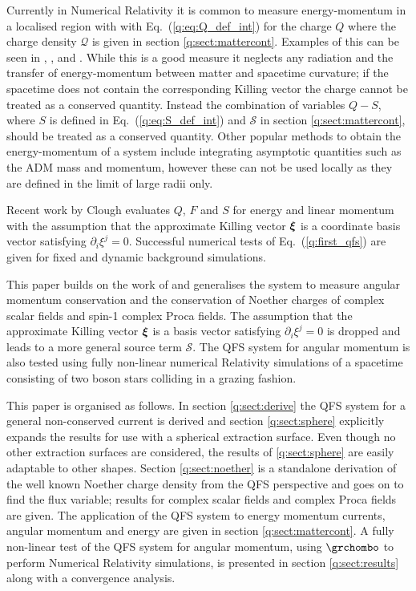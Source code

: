 Currently in Numerical Relativity it is common to measure energy-momentum in a localised region with with Eq.~(\ref{q:eq:Q_def_int}) for the charge $Q$ where the charge density $\mathcal{Q}$ is given in section \ref{q:sect:mattercont}. Examples of this can be seen in \cite{Sanchis_Gual_2019}, \cite{Di_Giovanni_2020},  \cite{PhysRevD.103.044059} and \cite{PhysRevD.96.024004}. While this is a good measure it neglects any radiation and the transfer of energy-momentum between matter and spacetime curvature; if the spacetime does not contain the corresponding Killing vector the charge cannot be treated as a conserved quantity. Instead the combination of variables $Q-S$, where $S$ is defined in Eq.~(\ref{q:eq:S_def_int}) and $\mathcal{S}$ in section \ref{q:sect:mattercont}, should be treated as a conserved quantity. Other popular methods to obtain the energy-momentum of a system include integrating asymptotic quantities such as the ADM mass and momentum, however these can not be used locally as they are defined in the limit of large radii only.

Recent work by Clough \cite{Clough_2021} evaluates $Q$, $F$ and $S$ for energy and linear momentum with the assumption that the approximate Killing vector $\boldsymbol{\xi}$ is a coordinate basis vector satisfying ${\partial_i \xi^j} =0$. Successful numerical tests of Eq.~(\ref{q:first_qfs}) are given for fixed and dynamic background simulations.

This paper builds on the work of \cite{Clough_2021} and generalises the system to measure angular momentum conservation and the conservation of Noether charges of complex scalar fields and spin-1 complex Proca fields. The assumption that the approximate Killing vector $\boldsymbol{\xi}$ is a basis vector satisfying $\partial_i \xi^j = 0$ is dropped and leads to a more general source term $\mathcal{S}$. The QFS system for angular momentum is also tested using fully non-linear numerical Relativity simulations of a spacetime consisting of two boson stars colliding in a grazing fashion.

This paper is organised as follows. In section \ref{q:sect:derive} the QFS system for a general non-conserved current is derived and section \ref{q:sect:sphere} explicitly expands the results for use with a spherical extraction surface. Even though no other extraction surfaces are considered, the results of \ref{q:sect:sphere} are easily adaptable  to other shapes. Section \ref{q:sect:noether} is a standalone derivation of the well known Noether charge density from the QFS perspective and goes on to find the flux variable; results for complex scalar fields and complex Proca fields are given. The application of the QFS system to energy momentum currents, angular momentum and energy are given in section \ref{q:sect:mattercont}. A fully non-linear test of the QFS system for angular momentum, using $\grchombo$ \cite{clough2015grchombo,Andrade2021} to perform Numerical Relativity simulations, is presented in section \ref{q:sect:results} along with a convergence analysis.











